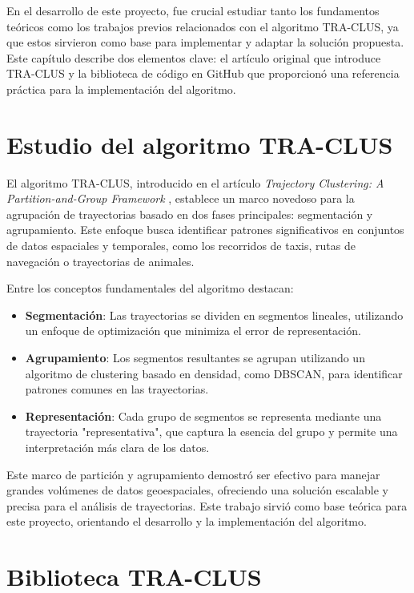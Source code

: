 
En el desarrollo de este proyecto, fue crucial estudiar tanto los fundamentos teóricos como los trabajos previos relacionados con el algoritmo TRA-CLUS, ya que estos sirvieron como base para implementar y adaptar la solución propuesta. Este capítulo describe dos elementos clave: el artículo original que introduce TRA-CLUS y la biblioteca de código en GitHub que proporcionó una referencia práctica para la implementación del algoritmo.

\section{Estudio del algoritmo TRA-CLUS}

El algoritmo TRA-CLUS, introducido en el artículo \emph{Trajectory Clustering: A Partition-and-Group Framework} \cite{lee2007trajectory}, establece un marco novedoso para la agrupación de trayectorias basado en dos fases principales: segmentación y agrupamiento. Este enfoque busca identificar patrones significativos en conjuntos de datos espaciales y temporales, como los recorridos de taxis, rutas de navegación o trayectorias de animales.

Entre los conceptos fundamentales del algoritmo destacan:

\begin{itemize}
    \item \textbf{Segmentación}: Las trayectorias se dividen en segmentos lineales, utilizando un enfoque de optimización que minimiza el error de representación.
    \item \textbf{Agrupamiento}: Los segmentos resultantes se agrupan utilizando un algoritmo de clustering basado en densidad, como DBSCAN, para identificar patrones comunes en las trayectorias.
    \item \textbf{Representación}: Cada grupo de segmentos se representa mediante una trayectoria "representativa", que captura la esencia del grupo y permite una interpretación más clara de los datos.
\end{itemize}

Este marco de partición y agrupamiento demostró ser efectivo para manejar grandes volúmenes de datos geoespaciales, ofreciendo una solución escalable y precisa para el análisis de trayectorias. Este trabajo sirvió como base teórica para este proyecto, orientando el desarrollo y la implementación del algoritmo.

\section{Biblioteca TRA-CLUS}

